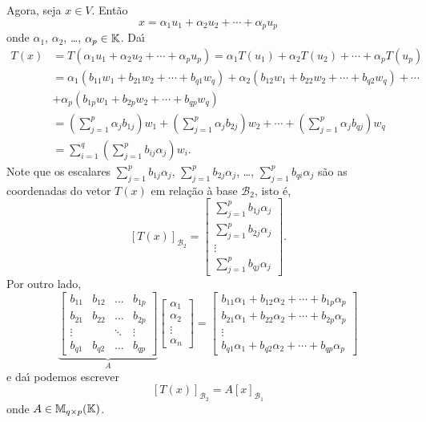 Agora, seja $x \in V$. Ent\~ao
\[
	x = \alpha_1u_1 + \alpha_2u_2 + \cdots + \alpha_pu_p
\]
onde $\alpha_1$, $\alpha_2$, \dots, $\alpha_p \in \mathbb{K}$. Da{\'\i}
\begin{align*}
	T(x) &= T(\alpha_1u_1 + \alpha_2u_2 + \cdots + \alpha_pu_p) = \alpha_1T(u_1) + \alpha_2T(u_2) + \cdots + \alpha_pT(u_p)\\
	&= \alpha_1(b_{11}w_1 + b_{21}w_2 + \cdots + b_{q1}w_q) + \alpha_2(b_{12}w_1 + b_{22}w_2 + \cdots + b_{q2}w_q) + \cdots \\
	&+ \alpha_p(b_{1p}w_1 + b_{2p}w_2 + \cdots + b_{qp}w_q)\\
	&= (\sum_{j=1}^p\alpha_jb_{1j})w_1 + (\sum_{j=1}^p\alpha_jb_{2j})w_2 + \cdots + (\sum_{j=1}^p\alpha_jb_{qj})w_q\\
	&= \sum_{i=1}^q\left(\sum_{j=1}^pb_{ij}\alpha_j\right)w_i.
\end{align*}
Note que os escalares $\sum_{j=1}^pb_{1j}\alpha_j$, $\sum_{j=1}^pb_{2j}\alpha_j$, \dots, $\sum_{j=1}^pb_{qi}\alpha_j$ s\~ao as coordenadas do vetor $T(x)$ em rela\c{c}\~ao \`a base $\mathcal{B}_2$, isto \'e,
\[
	[T(x)]_{\mathcal{B}_2} = \begin{bmatrix}
		\sum_{j=1}^p b_{1j}\alpha_j\\
		\sum_{j=1}^p b_{2j}\alpha_j\\
		\vdots\\
		\sum_{j=1}^p b_{qj}\alpha_j
	\end{bmatrix}.
\]
Por outro lado,
\[
	\underbrace{\begin{bmatrix}
		b_{11} & b_{12} & \dots & b_{1p}\\
		b_{21} & b_{22} & \dots & b_{2p}\\
		\vdots & & \ddots & \vdots\\
		b_{q1} & b_{q2} & \dots & b_{qp}
	\end{bmatrix}}_{A}\begin{bmatrix}
		\alpha_1\\
		\alpha_2\\
		\vdots\\
		\alpha_n
	\end{bmatrix} = \begin{bmatrix}
		b_{11}\alpha_1 + b_{12}\alpha_2 + \cdots + b_{1p}\alpha_p\\
		b_{21}\alpha_1 + b_{22}\alpha_2 + \cdots + b_{2p}\alpha_p\\
		\vdots \\
		b_{q1}\alpha_1 + b_{q2}\alpha_2 + \cdots + b_{qp}\alpha_p
	\end{bmatrix}
\]
e da{\'\i} podemos escrever
\[
	[T(x)]_{\mathcal{B}_2} = A[x]_{\mathcal{B}_1}
\]
onde $A \in \mathbb{M}_{q\times p}(\mathbb{K})$.

